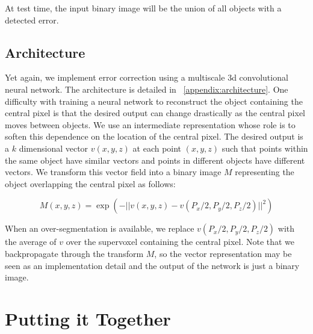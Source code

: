 \documentclass{article}
\begin{document}
At test time, the input binary image will be the union of all objects with a detected error.

\subsection{Architecture}
Yet again, we implement error correction using a multiscale 3d convolutional neural network. The architecture is detailed in ~\ref{appendix:architecture}. One difficulty with training a neural network to reconstruct the object containing the central pixel is that the desired output can change drastically as the central pixel moves between objects. We use an intermediate representation whose role is to soften this dependence on the location of the central pixel. The desired output is a $k$ dimensional vector $v(x,y,z)$ at each point $(x,y,z)$ such that points within the same object have similar vectors and points in different objects have different vectors. We transform this vector field into a binary image $M$ representing the object overlapping the central pixel as follows:

\begin{equation*}
	M(x,y,z)=\exp(-||v(x,y,z)-v(P_x/2,P_y/2,P_z/2)||^2)
\end{equation*}

When an over-segmentation is available, we replace $v(P_x/2,P_y/2,P_z/2)$ with the average of $v$ over the supervoxel containing the central pixel. Note that we backpropagate through the transform $M$, so the vector representation may be seen as an implementation detail and the output of the network is just a binary image.


\section{Putting it Together}
\end{document}
